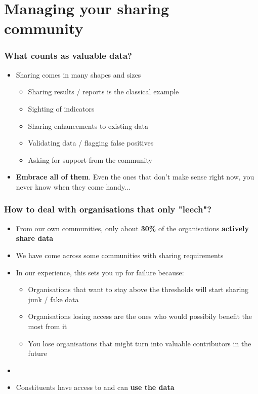 \section{Managing your sharing \\ community}

\begin{frame}
\frametitle{What counts as valuable data?}
\begin{itemize}
	\item Sharing comes in many shapes and sizes
	\begin{itemize}
		\item Sharing results / reports is the classical example
		\item Sighting of indicators
		\item Sharing enhancements to existing data
		\item Validating data / flagging false positives
		\item Asking for support from the community
	\end{itemize}
\item \textbf{Embrace all of them}. Even the ones that don't make sense right now, you never know when they come handy...
\end{itemize}
\end{frame}

\begin{frame}
\frametitle{How to deal with organisations that only "leech"?}
\begin{itemize}
    \item From our own communities, only about \textbf{30\%} of the organisations \textbf{actively share data}
	\item We have come across some communities with sharing requirements
	\item In our experience, this sets you up for failure because:
	\begin{itemize}
		\item Organisations that want to stay above the thresholds will start sharing junk / fake data
		\item Organisations losing access are the ones who would possibily benefit the most from it
		\item You lose organisations that might turn into valuable contributors in the future
	\end{itemize}
	\item []
	\item Constituents have access to and can \textbf{use the data}
\end{itemize}
\end{frame}

